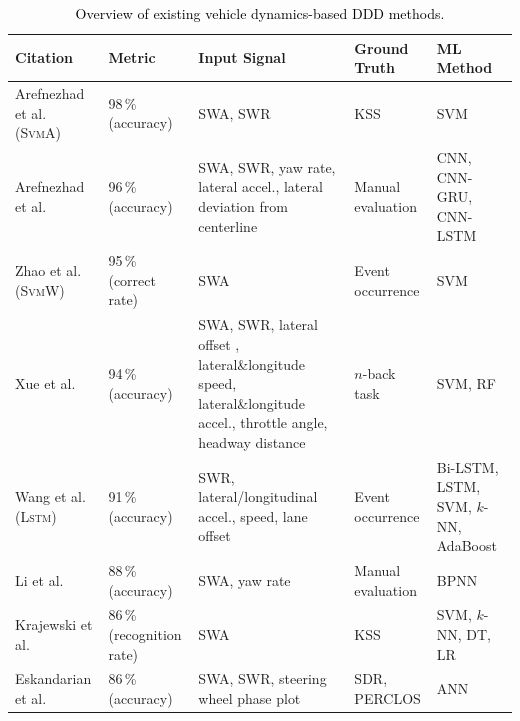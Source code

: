 \documentclass[letterpaper, 10 pt, conference]{ieeeconf}  %
\newcommand{\Review}[1]{\textcolor{black}{#1}}
\newcommand{\Impl}[1]{\textsc{#1}}
\begin{document}
\begin{table}[t]
    \centering
    \caption{\Review{Overview of existing vehicle dynamics-based DDD methods.}}
    \label{tab_all_ddd}
    \begin{tabular}{|m{2.8cm}|m{3.0cm}|>{\centering\arraybackslash}m{4.7cm}|>{\centering\arraybackslash}m{2.0cm}|>{\centering\arraybackslash}m{3cm}|}
        \hline
        \centering \textbf{Citation} 
        & \centering \textbf{Metric} & \centering \textbf{Input Signal} & \!\!\!\!\!\! \centering \textbf{Ground Truth} \!\!\!\!\!\! & \textbf{ML Method} \\
        \hline\hline
        Arefnezhad et al.
        \cite{Arefnezhad2019} (\Impl{SvmA}) & 98\,\% (accuracy) & SWA, SWR & KSS & {SVM} \\
        \hline
        Arefnezhad et al.
        \cite{Arefnezhad2020} & 96\,\% (accuracy) & SWA, SWR, yaw rate, lateral accel., lateral deviation from centerline 
        & %
        Manual evaluation
        & {CNN, CNN-GRU, CNN-LSTM} \\
        \hline
        Zhao et al.
        \cite{Zhao2009} (\Impl{SvmW}) & 95\,\% (correct rate) & SWA 
        & %
        Event occurrence
        & {SVM} \\
        \hline
        Xue et al.
        \cite{Xue2023} & 94\,\% (accuracy) & SWA, SWR, lateral offset , lateral\&longitude speed, lateral\&longitude accel., throttle angle, headway distance & $n$-back task 
        & {SVM, RF} \\
        \hline
        Wang et al.
        \cite{Wang2022} (\Impl{Lstm}) & 91\,\% (accuracy) & SWR, lateral/longitudinal accel., speed, lane offset 
        & %
        Event occurrence
        & {Bi-LSTM, LSTM, SVM, $k$-NN, AdaBoost} 
        \\ 
        \hline
        Li et al.
        \cite{Li2017_2} & 88\,\% (accuracy) & SWA, yaw rate 
        & %
        Manual evaluation
        & {BPNN} \\
        \hline
        Krajewski et al.
        \cite{Krajewski2009} & 86\,\% (recognition rate) & SWA & KSS & {SVM, $k$-NN, DT, LR} \\
        \hline
        \!\!\! Eskandarian et al.
        \cite{Eskandarian2007} \!\!\! & 86\,\% (accuracy) 
        & SWA, SWR, steering wheel phase plot & SDR, PERCLOS & {ANN} \\

\end{tabular}
\end{table}
\end{document}
